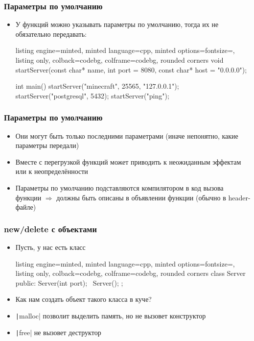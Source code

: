 \documentclass[10pt]{beamer}
\begin{document}
\begin{frame}[fragile]
\frametitle{Параметры по умолчанию}
\begin{itemize}
\item У функций можно указывать параметры по умолчанию, тогда их не обязательно передавать:
\begin{tcblisting}{listing engine=minted, minted language=cpp, minted options={fontsize=\scriptsize}, listing only, colback=codebg, colframe=codebg, rounded corners}
void startServer(const char* name, int port = 8080,
  const char* host = "0.0.0.0");

int main()
{
  startServer("minecraft", 25565, "127.0.0.1");
  startServer("postgresql", 5432);
  startServer("ping");
}
\end{tcblisting}
\end{itemize}
\end{frame}

\begin{frame}[fragile]
\frametitle{Параметры по умолчанию}
\begin{itemize}
\item Они могут быть только последними параметрами (иначе непонятно, какие параметры передали)
\pause
\item Вместе с перегрузкой функций может приводить к неожиданным эффектам или к неопределённости
\pause
\item Параметры по умолчанию подставляются компилятором в код вызова функции \(\Longrightarrow\) должны быть описаны в объявлении функции (обычно в header-файле)
\end{itemize}
\end{frame}

\begin{frame}[fragile]
\frametitle{new/delete с объектами}
\begin{itemize}
\item Пусть, у нас есть класс
\begin{tcblisting}{listing engine=minted, minted language=cpp, minted options={fontsize=\scriptsize}, listing only, colback=codebg, colframe=codebg, rounded corners}
class Server {
public:
  Server(int port);
  ~Server();
};
\end{tcblisting}
\pause
\item Как нам создать объект такого класса в куче?
\pause
{}
\item \texttt|malloc| позволит выделить память, но не вызовет конструктор
\pause
\item \texttt|free| не вызовет деструктор
\end{itemize}
\end{frame}
\end{document}

